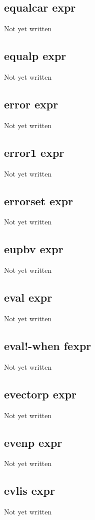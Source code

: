 \documentclass[a4paper,11pt]{article}
\begin{document}
{\subsection{\ttfamily equalcar expr}
Not yet written

\subsection{\ttfamily equalp expr}
Not yet written

\subsection{\ttfamily error expr}
Not yet written

\subsection{\ttfamily error1 expr}
Not yet written

\subsection{\ttfamily errorset expr}
Not yet written

\subsection{\ttfamily eupbv expr}
Not yet written

\subsection{\ttfamily eval expr}
Not yet written

\subsection{\ttfamily eval!-when fexpr}
Not yet written

\subsection{\ttfamily evectorp expr}
Not yet written

\subsection{\ttfamily evenp expr}
Not yet written

\subsection{\ttfamily evlis expr}
Not yet written

}
\end{document}
